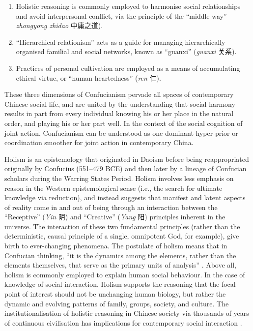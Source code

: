 \begin{CJK}{UTF8}{gbsn}
\begin{enumerate}
  \item Holistic reasoning is commonly employed to harmonise social relationships and avoid interpersonal conflict, via the principle of the  ``middle way'' \textit{zhongyong zhidao} 中庸之道).
  \item ``Hierarchical relationism'' acts as a guide for managing hierarchically organised familial and social networks, known as ``guanxi'' (\textit{guanxi} 关系).
  \item Practices of personal cultivation are employed as a means of accumulating ethical virtue, or ``human heartedness'' (\textit{ren} 仁).
\end{enumerate}

These three dimensions of Confucianism pervade all spaces of contemporary Chinese social life, and are united by the understanding that social harmony results in part from every individual knowing his or her place in the natural order, and playing his or her part well.  In the context of the social cognition of joint action, Confucianism can be understood as one dominant hyper-prior or coordination smoother for joint action in contemporary China.


Holism is an epistemology that originated in Daoism before being reappropriated originally by Confucius (551–479 BCE) and then later by a lineage of Confucian scholars during the Warring States Period.  Holism involves less emphasis on reason in the Western epistemological sense (i.e., the search for ultimate knowledge via reduction), and instead suggests that manifest and latent aspects of reality come in and out of being through an interaction between the ``Receptive'' (\textit{Yin} 阴) and ``Creative'' (\textit{Yang} 阳) principles inherent in the universe.  The interaction of these two fundamental principles (rather than the deterministic, causal principle of a single, omnipotent God, for example), give birth to ever-changing phenomena.  The postulate of holism means that in Confucian thinking, ``it is the dynamics among the elements, rather than the elements themselves, that serve as the primary units of analysis'' \citep[156]{Ji2010}. Above all, holism is commonly employed to explain human social behaviour.  In the case of knowledge of social interaction, Holism supports the reasoning that the focal point of interest should not be unchanging human biology, but rather the dynamic and evolving patterns of family, groups, society, and culture.  The institutionalisation of holistic reasoning in Chinese society via thousands of years of continuous civilisation has implications for contemporary social interaction \cite{Nisbett2003}.



\end{CJK}
